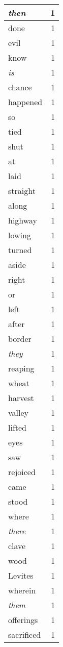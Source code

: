 \begin{center}
\begin{longtable}{l|r}
\emph{then} & 1 \\ \hline
done & 1 \\ \hline
evil & 1 \\ \hline
know & 1 \\ \hline
\emph{is} & 1 \\ \hline
chance & 1 \\ \hline
happened & 1 \\ \hline
so & 1 \\ \hline
tied & 1 \\ \hline
shut & 1 \\ \hline
at & 1 \\ \hline
laid & 1 \\ \hline
straight & 1 \\ \hline
along & 1 \\ \hline
highway & 1 \\ \hline
lowing & 1 \\ \hline
turned & 1 \\ \hline
aside & 1 \\ \hline
right & 1 \\ \hline
or & 1 \\ \hline
left & 1 \\ \hline
after & 1 \\ \hline
border & 1 \\ \hline
\emph{they} & 1 \\ \hline
reaping & 1 \\ \hline
wheat & 1 \\ \hline
harvest & 1 \\ \hline
valley & 1 \\ \hline
lifted & 1 \\ \hline
eyes & 1 \\ \hline
saw & 1 \\ \hline
rejoiced & 1 \\ \hline
came & 1 \\ \hline
stood & 1 \\ \hline
where & 1 \\ \hline
\emph{there} & 1 \\ \hline
clave & 1 \\ \hline
wood & 1 \\ \hline
Levites & 1 \\ \hline
wherein & 1 \\ \hline
\emph{them} & 1 \\ \hline
offerings & 1 \\ \hline
sacrificed & 1 \\ \hline

\end{longtable}
\end{center}
